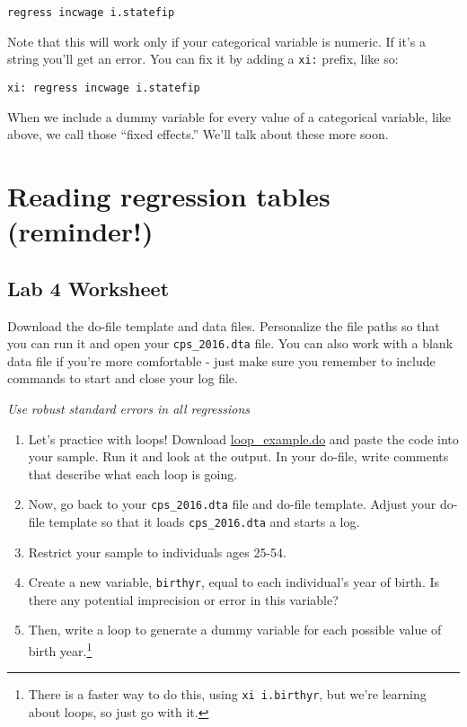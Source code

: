 \documentclass[11pt]{article}
\begin{document}
\begin{verbatim}
regress incwage i.statefip
\end{verbatim}

Note that this will work only if your categorical variable is numeric.
If it's a string you'll get an error. You can fix it by adding a
\texttt{xi:} prefix, like so:

\begin{verbatim}
xi: regress incwage i.statefip
\end{verbatim}

When we include a dummy variable for every value of a categorical
variable, like above, we call those ``fixed effects.'' We'll talk about
these more soon.

\hypertarget{reading-regression-tables-reminder}{%
\section*{Reading regression tables
(reminder!)}\label{reading-regression-tables-reminder}}

\hypertarget{lab-4-worksheet}{%
\subsection*{Lab 4 Worksheet}\label{lab-4-worksheet}}

Download the do-file template and data files. Personalize the file paths
so that you can run it and open your \texttt{cps\_2016.dta} file. You
can also work with a blank data file if you're more comfortable - just
make sure you remember to include commands to start and close your log
file.

\emph{Use robust standard errors in all regressions}

\begin{enumerate}
\def\labelenumi{\arabic{enumi}.}
\item
  Let's practice with loops! Download
  \href{https://ec200f21.netlify.app/assignment/materials/loop_example.do}{loop\_example.do} and paste the
  code into your sample. Run it and look at the output. In your do-file,
  write comments that describe what each loop is going.
\item
  Now, go back to your \texttt{cps\_2016.dta} file and do-file template.
  Adjust your do-file template so that it loads \texttt{cps\_2016.dta}
  and starts a log.
\item
  Restrict your sample to individuals ages 25-54.
\item
  Create a new variable, \texttt{birthyr}, equal to each individual's
  year of birth. Is there any potential imprecision or error in this
  variable?
\item
  Then, write a loop to generate a dummy variable for each possible
  value of birth year.\footnote{There is a faster way to do this, using
    \texttt{xi\ i.birthyr}, but we're learning about loops, so just go
    with it.}
\end{enumerate}
\end{document}
